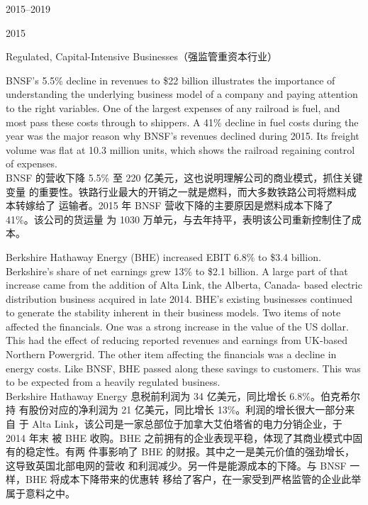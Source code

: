 \begin{chapter}{2015--2019}
\begin{section}{2015}
\begin{subsection}{Regulated, Capital-Intensive Businesses（强监管重资本行业）}
\begin{verseparallel}
  {
    BNSF's 5.5\% decline in revenues to \$22 billion illustrates the importance
    of understanding the underlying business model of a company and paying
    attention to the right variables. One of the largest expenses of any
    railroad is fuel, and most pass these costs through to shippers. A 41\%
    decline in fuel costs during the year was the major reason why BNSF's
    revenues declined during 2015. Its freight volume was flat at 10.3 million
    units, which shows the railroad regaining control of expenses. \\
  }
  {
    BNSF 的营收下降 5.5\% 至 220 亿美元，这也说明理解公司的商业模式，抓住关键变量
    的重要性。铁路行业最大的开销之一就是燃料，而大多数铁路公司将燃料成本转嫁给了
    运输者。2015 年 BNSF 营收下降的主要原因是燃料成本下降了 41\%。该公司的货运量
    为 1030 万单元，与去年持平，表明该公司重新控制住了成本。
  }
\end{verseparallel}

\begin{verseparallel}
  {
    Berkshire Hathaway Energy (BHE) increased EBIT 6.8\% to \$3.4 billion.
    Berkshire's share of net earnings grew 13\% to \$2.1 billion. A large part
    of that increase came from the addition of Alta Link, the Alberta, Canada-
    based electric distribution business acquired in late 2014. BHE's existing
    businesses continued to generate the stability inherent in their business
    models. Two items of note affected the financials. One was a strong increase
    in the value of the US dollar. This had the effect of reducing reported
    revenues and earnings from UK-based Northern Powergrid. The other item
    affecting the financials was a decline in energy costs. Like BNSF, BHE
    passed along these savings to customers. This was to be expected from a
    heavily regulated business. \\
  }
  {
    Berkshire Hathaway Energy 息税前利润为 34 亿美元，同比增长 6.8\%。伯克希尔持
    有股份对应的净利润为 21 亿美元，同比增长 13\%。利润的增长很大一部分来自
    于 Alta Link，该公司是一家总部位于加拿大艾伯塔省的电力分销企业，于 2014 年末
    被 BHE 收购。BHE 之前拥有的企业表现平稳，体现了其商业模式中固有的稳定性。有两
    件事影响了 BHE 的财报。其中之一是美元价值的强劲增长，这导致英国北部电网的营收
    和利润减少。另一件是能源成本的下降。与 BNSF 一样，BHE 将成本下降带来的优惠转
    移给了客户，在一家受到严格监管的企业此举属于意料之中。
  }
\end{verseparallel}
\end{subsection}


\end{section}
\end{chapter}
